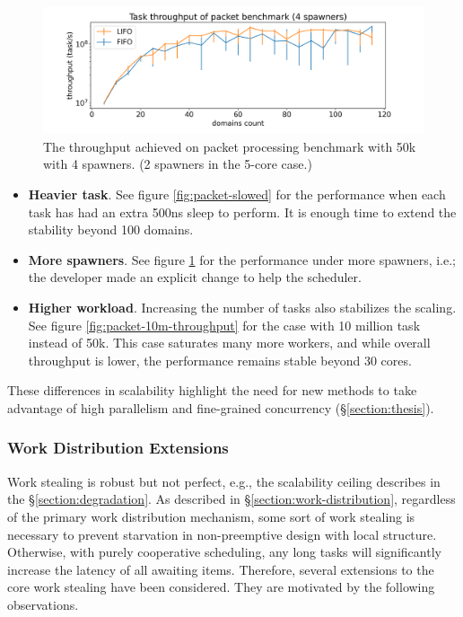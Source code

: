 \documentclass[12pt,a4paper,twoside]{report}
\begin{document}
\begin{figure} 
     \centering 
     \includegraphics[width=1\textwidth]{eval/packet-basic-4spawners-just-throughput-bigger_font.png}
     \caption{The throughput achieved on packet processing benchmark with 50k with 4 spawners. (2 spawners in the 5-core case.) }
    \label{fig:packet-4spawners}
\end{figure}

\begin{itemize}
    \item \textbf{Heavier task}. See figure \ref{fig:packet-slowed} for the performance when each task has had an extra 500ns sleep to perform. It is enough time to extend the stability beyond 100 domains.
    \item \textbf{More spawners}. See figure \ref{fig:packet-4spawners} for the performance under more spawners, i.e.; the developer made an explicit change to help the scheduler.
    \item \textbf{Higher workload}. Increasing the number of tasks also stabilizes the scaling. See figure \ref{fig:packet-10m-throughput} for the case with 10 million task instead of 50k. This case saturates many more workers, and while overall throughput is lower, the performance remains stable beyond 30 cores. 
\end{itemize}
These differences in scalability highlight the need for new methods to take advantage of high parallelism and fine-grained concurrency (\S\ref{section:thesis}).

\subsubsection{Work Distribution Extensions}
\label{section:work-distribution-extensions}

Work stealing is robust but not perfect, e.g., the scalability ceiling describes in the \S\ref{section:degradation}. As described in \S\ref{section:work-distribution}, regardless of the primary work distribution mechanism, some sort of work stealing is necessary to prevent starvation in non-preemptive design with local structure. Otherwise, with purely cooperative scheduling, any long tasks will significantly increase the latency of all awaiting items. Therefore, several extensions to the core work stealing have been considered. They are motivated by the following observations.
\end{document}
